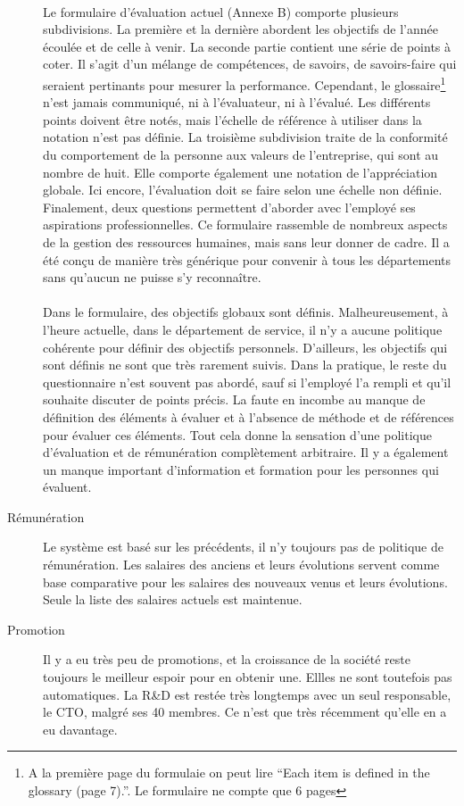 \begin{description}
\paragraph{}Le formulaire d'évaluation actuel (Annexe B) comporte plusieurs subdivisions. La première et la dernière abordent les objectifs de l'année écoulée et de celle à venir. La seconde partie contient une série de points à coter. Il s'agit d'un mélange de compétences, de savoirs, de savoirs-faire qui seraient pertinants pour mesurer la performance. Cependant, le glossaire\footnote{A la première page du formulaie on peut lire \enquote{Each item is defined in the glossary (page 7).}. Le formulaire ne compte que 6 pages} n'est jamais communiqué, ni à l'évaluateur, ni à l'évalué. Les différents points doivent être notés, mais l'échelle de référence à utiliser dans la notation n'est pas définie. La troisième subdivision traite de la conformité du comportement de la personne aux valeurs de l'entreprise, qui sont au nombre de huit. Elle comporte également une notation de l'appréciation globale. Ici encore, l'évaluation doit se faire selon une échelle non définie. Finalement, deux questions permettent d'aborder avec l'employé ses aspirations professionnelles. Ce formulaire rassemble de nombreux aspects de la gestion des ressources humaines, mais sans leur donner de cadre. Il a été conçu de manière très générique pour convenir à tous les départements sans qu'aucun ne puisse s'y reconnaître.

\paragraph{}Dans le formulaire, des objectifs globaux sont définis. Malheureusement, à l'heure actuelle, dans le département de service, il n'y a aucune politique cohérente pour définir des objectifs personnels. D'ailleurs, les objectifs qui sont définis ne sont que très rarement suivis. Dans la pratique, le reste du questionnaire n'est souvent pas abordé, sauf si l'employé l'a rempli et qu'il souhaite discuter de points précis. La faute en incombe au manque de définition des éléments à évaluer et à l'absence de méthode et de références pour évaluer ces éléments. Tout cela donne la sensation d'une politique d'évaluation et de rémunération complètement arbitraire. Il y a également un manque important d'information et formation pour les personnes qui évaluent.
  \item[Rémunération] Le système est basé sur les précédents, il n'y toujours pas de politique de rémunération. Les salaires des anciens et leurs évolutions servent comme base comparative pour les salaires des nouveaux venus et leurs évolutions. Seule la liste des salaires actuels est maintenue.
  
  \item[Promotion] Il y a eu très peu de promotions, et la croissance de la société reste toujours le meilleur espoir pour en obtenir une. Ellles ne sont toutefois pas automatiques. La R\&D est restée très longtemps avec un seul responsable, le CTO, malgré ses 40 membres. Ce n'est que très récemment qu'elle en a eu davantage.  
\end{description}

